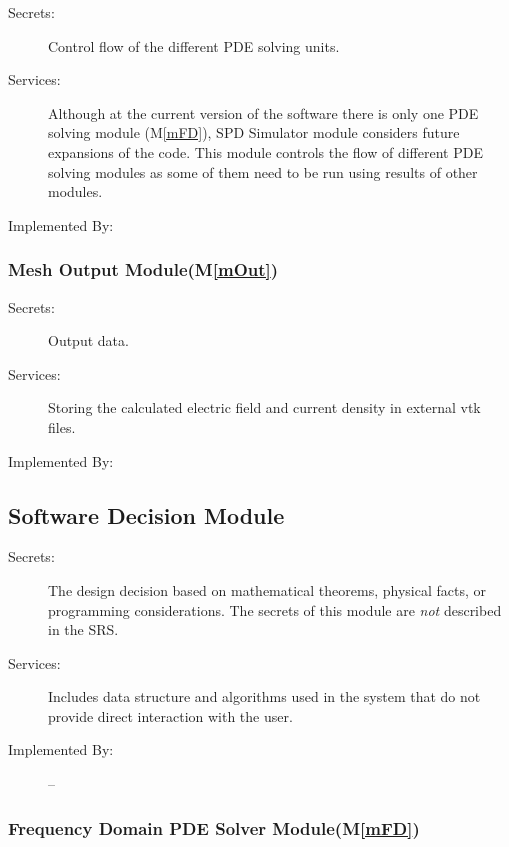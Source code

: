 \documentclass[12pt, titlepage]{article}
\newcommand{\mref}[1]{M\ref{#1}}
\begin{document}
	\begin{description} \item[Secrets:]Control flow of the different PDE solving
		units. \item[Services:]Although at the current version of the software there is
		only one PDE solving module (M\ref{mFD}), SPD Simulator module considers future
		expansions of the code. This module controls the flow of different PDE solving
		modules as some of them need to be run using results of other modules.
		\item[Implemented By:] \progname{} \end{description}
	
	\subsubsection{Mesh Output Module(\mref{mOut})}
	
	\begin{description} \item[Secrets:]Output data. \item[Services:]Storing the
		calculated electric field and current density in external vtk files.
		\item[Implemented By:] \progname{} \end{description}
	
	
	\subsection{Software Decision Module}
	
	\begin{description} \item[Secrets:] The design decision based on mathematical
		theorems, physical facts, or programming considerations. The secrets of this
		module are \emph{not} described in the SRS. \item[Services:] Includes data
		structure and algorithms used in the system that do not provide direct
		interaction with the user. %
		\item[Implemented By:] -- \end{description}
	
	
	\subsubsection{Frequency Domain PDE Solver Module(\mref{mFD})}
	
\end{document}

